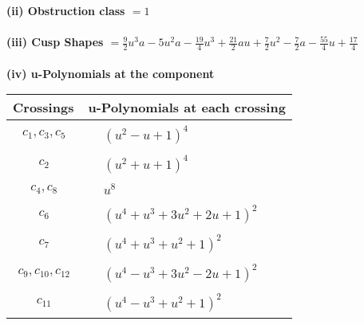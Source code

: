 \documentclass[1p]{elsarticle_modified}
\theoremstyle{definition}
\begin{document}
\flushleft \textbf{(ii) Obstruction class $= 1$}\\~\\
\flushleft \textbf{(iii) Cusp Shapes $= \frac{9}{2} u^3 a-5 u^2 a-\frac{19}{4} u^3+\frac{21}{2} a u+\frac{7}{2} u^2-\frac{7}{2} a-\frac{55}{4} u+\frac{17}{4}$}\\~\\
\newpage\renewcommand{\arraystretch}{1}
\flushleft \textbf{(iv) u-Polynomials at the component}\newline \\
\begin{tabular}{m{50pt}|m{274pt}}
Crossings & \hspace{64pt}u-Polynomials at each crossing \\
\hline $$\begin{aligned}c_{1},c_{3},c_{5}\end{aligned}$$&$\begin{aligned}
&(u^2- u+1)^4
\end{aligned}$\\
\hline $$\begin{aligned}c_{2}\end{aligned}$$&$\begin{aligned}
&(u^2+u+1)^4
\end{aligned}$\\
\hline $$\begin{aligned}c_{4},c_{8}\end{aligned}$$&$\begin{aligned}
&u^8
\end{aligned}$\\
\hline $$\begin{aligned}c_{6}\end{aligned}$$&$\begin{aligned}
&(u^4+u^3+3 u^2+2 u+1)^2
\end{aligned}$\\
\hline $$\begin{aligned}c_{7}\end{aligned}$$&$\begin{aligned}
&(u^4+u^3+u^2+1)^2
\end{aligned}$\\
\hline $$\begin{aligned}c_{9},c_{10},c_{12}\end{aligned}$$&$\begin{aligned}
&(u^4- u^3+3 u^2-2 u+1)^2
\end{aligned}$\\
\hline $$\begin{aligned}c_{11}\end{aligned}$$&$\begin{aligned}
&(u^4- u^3+u^2+1)^2
\end{aligned}$\\
\hline
\end{tabular}\\~\\
\end{document}
